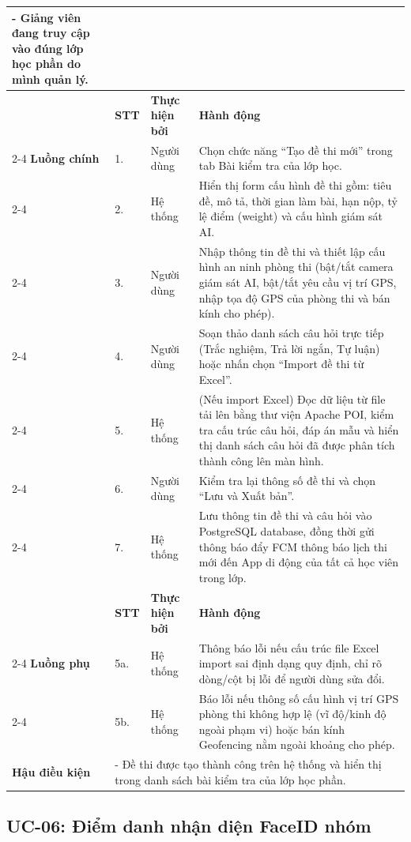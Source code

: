 \documentclass[../DoAn.tex]{subfiles}
\begin{document}
\begin{longtable}{|p{2.8cm}|p{0.8cm}|p{2.2cm}|p{7.5cm}|}
{      - Giảng viên đang truy cập vào đúng lớp học phần do mình quản lý.} \\ \hline
     & \textbf{STT} & \textbf{Thực hiện bởi} & \textbf{Hành động} \\ \cline{2-4}
    \textbf{Luồng chính} & 1. & Người dùng & Chọn chức năng ``Tạo đề thi mới'' trong tab Bài kiểm tra của lớp học. \\ \cline{2-4}
     & 2. & Hệ thống & Hiển thị form cấu hình đề thi gồm: tiêu đề, mô tả, thời gian làm bài, hạn nộp, tỷ lệ điểm (weight) và cấu hình giám sát AI. \\ \cline{2-4}
     & 3. & Người dùng & Nhập thông tin đề thi và thiết lập cấu hình an ninh phòng thi (bật/tắt camera giám sát AI, bật/tắt yêu cầu vị trí GPS, nhập tọa độ GPS của phòng thi và bán kính cho phép). \\ \cline{2-4}
     & 4. & Người dùng & Soạn thảo danh sách câu hỏi trực tiếp (Trắc nghiệm, Trả lời ngắn, Tự luận) hoặc nhấn chọn ``Import đề thi từ Excel''. \\ \cline{2-4}
     & 5. & Hệ thống & (Nếu import Excel) Đọc dữ liệu từ file tải lên bằng thư viện Apache POI, kiểm tra cấu trúc câu hỏi, đáp án mẫu và hiển thị danh sách câu hỏi đã được phân tích thành công lên màn hình. \\ \cline{2-4}
     & 6. & Người dùng & Kiểm tra lại thông số đề thi và chọn ``Lưu và Xuất bản''. \\ \cline{2-4}
     & 7. & Hệ thống & Lưu thông tin đề thi và câu hỏi vào PostgreSQL database, đồng thời gửi thông báo đẩy FCM thông báo lịch thi mới đến App di động của tất cả học viên trong lớp. \\ \hline
     & \textbf{STT} & \textbf{Thực hiện bởi} & \textbf{Hành động} \\ \cline{2-4}
    \textbf{Luồng phụ} & 5a. & Hệ thống & Thông báo lỗi nếu cấu trúc file Excel import sai định dạng quy định, chỉ rõ dòng/cột bị lỗi để người dùng sửa đổi. \\ \cline{2-4}
     & 5b. & Hệ thống & Báo lỗi nếu thông số cấu hình vị trí GPS phòng thi không hợp lệ (vĩ độ/kinh độ ngoài phạm vi) hoặc bán kính Geofencing nằm ngoài khoảng cho phép. \\ \hline
    \textbf{Hậu điều kiện} & \multicolumn{3}{p{10.9cm}|}{- Đề thi được tạo thành công trên hệ thống và hiển thị trong danh sách bài kiểm tra của lớp học phần.} \\ \hline
\end{longtable}

\subsection{UC-06: Điểm danh nhận diện FaceID nhóm}
\end{document}
